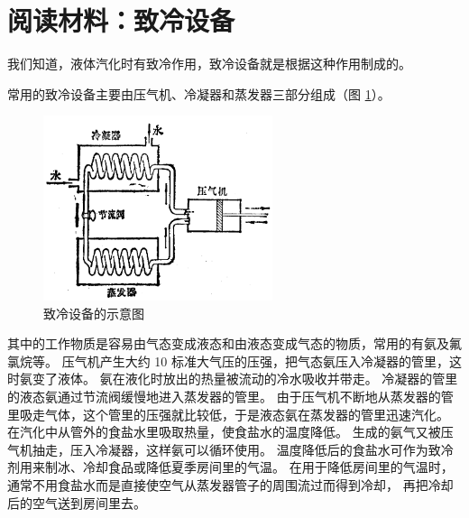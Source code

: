 \section*{阅读材料：致冷设备}

我们知道，液体汽化时有致冷作用，致冷设备就是根据这种作用制成的。

常用的致冷设备主要由压气机、冷凝器和蒸发器三部分组成（图 \ref{fig:4-9}）。
\begin{figure}[htbp]
    \centering
    \includegraphics[width=0.6\textwidth]{../pic/czwl2-ch4-9}
    \caption{致冷设备的示意图}\label{fig:4-9}
\end{figure}
其中的工作物质是容易由气态变成液态和由液态变成气态的物质，常用的有氨及氟氯烷等。
压气机产生大约 10 标准大气压的压强，把气态氨压入冷凝器的管里，这时氨变了液体。
氨在液化时放出的热量被流动的冷水吸收并带走。
冷凝器的管里的液态氨通过节流阀缓慢地进入蒸发器的管里。
由于压气机不断地从蒸发器的管里吸走气体，这个管里的压强就比较低，于是液态氨在蒸发器的管里迅速汽化。
在汽化中从管外的食盐水里吸取热量，使食盐水的温度降低。
生成的氨气又被压气机抽走，压入冷凝器，这样氨可以循环使用。
温度降低后的食盐水可作为致冷剂用来制冰、冷却食品或降低夏季房间里的气温。
在用于降低房间里的气温时，通常不用食盐水而是直接使空气从蒸发器管子的周围流过而得到冷却，
再把冷却后的空气送到房间里去。


